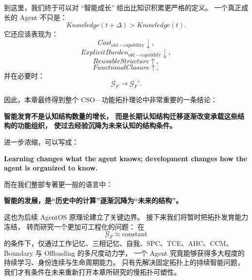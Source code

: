 到这里，我们终于可以对 ``智能成长'' 给出比知识积累更严格的定义。
一个真正成长的 Agent 不只是：
\[
Knowledge(t+\Delta)>Knowledge(t).
\]
它还应该表现为：
\[
Cost_{\mathrm{old-capability}}\downarrow,
\]
\[
ExplicitBurden_{\mathrm{old-capability}}\downarrow,
\]
\[
ReusableStructure\uparrow,
\]
\[
FunctionalClosure\uparrow,
\]
并在必要时：
\[
\mathcal G_F
\rightarrow
\mathcal G_F'.
\]

因此，本章最终得到整个 CSO—功能拓扑理论中非常重要的一条结论：

\begin{conclusion}
\bfseries
智能发育不是认知结构数量的增长，
而是长期认知结构迁移逐渐改变承载这些结构的功能组织，
使过去经验沉降为未来认知的结构条件。
\end{conclusion}

进一步浓缩，可以写成：

\begin{conclusion}
\bfseries
Learning changes what the agent knows;
development changes how the agent is organized to know.
\end{conclusion}

而在我们整部专著更一般的语言中：

\begin{statementbox}
\bfseries
智能的发展，是“历史中的计算”逐渐沉降为“未来的结构”。
\end{statementbox}

这也为后续 AgentOS 原理论建立了关键边界。
接下来我们将暂时把拓扑发育能力冻结，
转而研究一个更加可工程化的问题：
在
\[
\boxed{
\mathcal G_F\approx\mathrm{constant}
}
\]
的条件下，仅通过工作记忆、三相记忆、自我、SPC、TCE、AHC、CCM、
Boundary 与 Offloading 的多尺度动力学，
一个 Agent 究竟能够获得多大程度的持续学习、身份连续与生命周期能力。
只有先解决固定拓扑上的持续智能问题，
我们才有条件在未来重新打开本章所研究的慢拓扑可塑性。
